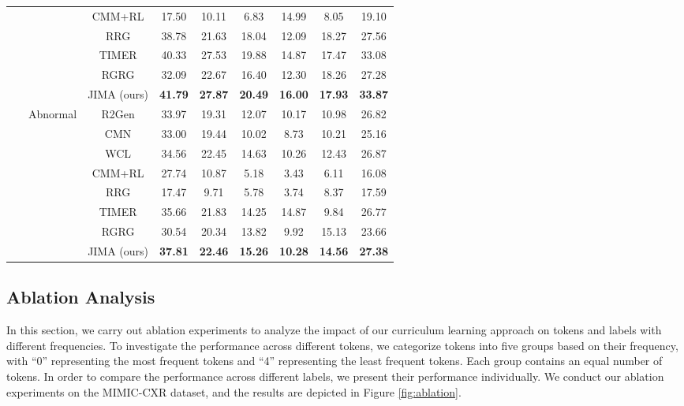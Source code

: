 \documentclass[sn-mathphys-num]{sn-jnl}%
\theoremstyle{thmstyleone}%
\theoremstyle{thmstyletwo}%
\theoremstyle{thmstylethree}%
\begin{document}
\begin{table*}[htp]
{\begin{tabular}{c|c|c|c|c|c|c|c|c}
        ~ & ~ & CMM+RL &17.50	&10.11	&6.83	&14.99	&8.05	&19.10 \\ 
        ~ & ~ & RRG &38.78 &21.63 &18.04 &12.09 &18.27 &27.56 \\
       ~ & ~ & TIMER &40.33 &27.53 &19.88 &14.87 &17.47 &33.08\\
       ~&~& RGRG &32.09 &22.67 &16.40 &12.30 &18.26 &27.28 \\
        ~ & ~ & JIMA (ours) &\textbf{ 41.79} & \textbf{27.87 }&\textbf{20.49} & \textbf{16.00} &\textbf{17.93} &\textbf{33.87} \\\hhline{~|--------}
        ~ & \multirow{7}{*}{Abnormal} & R2Gen & 33.97 & 19.31 & 12.07 &10.17 & 10.98 & 26.82 \\ 
        ~ & ~ & CMN & 33.00 & 19.44 & 10.02 & 8.73 & 10.21 & 25.16 \\ 
        ~ & ~ & WCL & 34.56 & 22.45 & 14.63 & 10.26 & 12.43 & 26.87 \\
        ~ & ~ & CMM+RL & 27.74 &10.87	&5.18	&3.43	&6.11 &	16.08 \\ 
        ~ & ~ & RRG &17.47 &9.71 &5.78 &3.74 &8.37 &17.59\\
      ~ & ~ & TIMER &35.66 &21.83 &14.25 &14.87 &9.84 &26.77\\
      ~&~&RGRG &30.54 &20.34 &13.82 &9.92 &15.13 &23.66 \\
        ~ & ~ & JIMA (ours) &\textbf{37.81} &\textbf{22.46} &\textbf{15.26} &\textbf{10.28} &\textbf{14.56} &\textbf{27.38}\\
    \end{tabular}
    }
\end{table*}

\subsection{Ablation Analysis}
In this section, we carry out ablation experiments to analyze the impact of our curriculum learning approach on tokens and labels with different frequencies. To investigate the performance across different tokens, we categorize tokens into five groups based on their frequency, with ``0'' representing the most frequent tokens and ``4'' representing the least frequent tokens. Each group contains an equal number of tokens. In order to compare the performance across different labels, we present their performance individually. We conduct our ablation experiments on the MIMIC-CXR dataset, and the results are depicted in Figure \ref{fig:ablation}.

\end{document}
